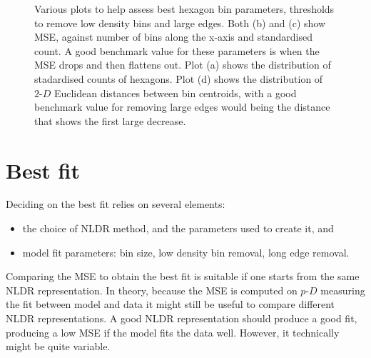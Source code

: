 \documentclass[
  12pt]{article}
\providecommand{\tightlist}{%
  \setlength{\itemsep}{0pt}\setlength{\parskip}{0pt}}\usepackage{longtable,booktabs,array}
\def\tightlist{}
\newcommand\pD{$p\text{-}D$}
\begin{document}
\begin{figure}[H]


\caption{\label{fig-param-scurve}Various plots to help assess best
hexagon bin parameters, thresholds to remove low density bins and large
edges. Both (b) and (c) show MSE, against number of bins along the
x-axis and standardised count. A good benchmark value for these
parameters is when the MSE drops and then flattens out. Plot (a) shows
the distribution of stadardised counts of hexagons. Plot (d) shows the
distribution of \(2\text{-}D\) Euclidean distances between bin
centroids, with a good benchmark value for removing large edges would
being the distance that shows the first large decrease.}

\end{figure}%

\section{Best fit}\label{best-fit}

Deciding on the best fit relies on several elements:

\begin{itemize}
\tightlist
\item
  the choice of NLDR method, and the parameters used to create it, and
\item
  model fit parameters: bin size, low density bin removal, long edge
  removal.
\end{itemize}

Comparing the MSE to obtain the best fit is suitable if one starts from
the same NLDR representation. In theory, because the MSE is computed on
\pD{} measuring the fit between model and data it might still be useful
to compare different NLDR representations. A good NLDR representation
should produce a good fit, producing a low MSE if the model fits the
data well. However, it technically might be quite variable.
\end{document}
